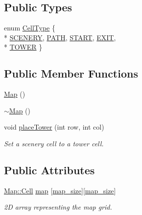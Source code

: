\subsection*{Public Types}
\begin{DoxyCompactItemize}
\item 
enum \hyperlink{class_map_a25b1781a19b5a600a92f0487b823b272}{Cell\+Type} \{ \\*
\hyperlink{class_map_a25b1781a19b5a600a92f0487b823b272a887dcf135465781cd226cb80beeed332}{S\+C\+E\+N\+E\+R\+Y}, 
\hyperlink{class_map_a25b1781a19b5a600a92f0487b823b272a85ec32a17e33d95e9196319cd62060b3}{P\+A\+T\+H}, 
\hyperlink{class_map_a25b1781a19b5a600a92f0487b823b272a6a7572793842e84c9a4e94cfa9e417bb}{S\+T\+A\+R\+T}, 
\hyperlink{class_map_a25b1781a19b5a600a92f0487b823b272a0947300fe39206c7e2f5174d50974ba0}{E\+X\+I\+T}, 
\\*
\hyperlink{class_map_a25b1781a19b5a600a92f0487b823b272a80b3934f045ce22b4394dbb4e55c5645}{T\+O\+W\+E\+R}
 \}
\end{DoxyCompactItemize}
\subsection*{Public Member Functions}
\begin{DoxyCompactItemize}
\item 
\hyperlink{class_map_a0f5ad0fd4563497b4214038cbca8b582}{Map} ()
\item 
\hyperlink{class_map_aa403fbe09394ccf39747588f5168e3b2}{$\sim$\+Map} ()
\item 
void \hyperlink{class_map_a0a7e6088ebbdc4fa9b82896841933014}{place\+Tower} (int row, int col)
\begin{DoxyCompactList}\small\item\em Set a scenery cell to a tower cell. \end{DoxyCompactList}\end{DoxyCompactItemize}
\subsection*{Public Attributes}
\begin{DoxyCompactItemize}
\item 
\hyperlink{struct_map_1_1_cell}{Map\+::\+Cell} \hyperlink{class_map_aa5d63b554ad19c18cdc9911536e42001}{map} \mbox{[}\hyperlink{class_map_a6f922edb15340e98aee860d269e50703}{map\+\_\+size}\mbox{]}\mbox{[}\hyperlink{class_map_a6f922edb15340e98aee860d269e50703}{map\+\_\+size}\mbox{]}
\begin{DoxyCompactList}\small\item\em 2\+D array representing the map grid. \end{DoxyCompactList}\end{DoxyCompactItemize}
